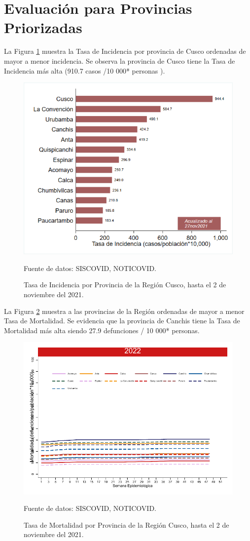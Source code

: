 \documentclass[12pt,a4paper,openany]{book}
\begin{document}

\clearpage

	\section*{Evaluación para Provincias Priorizadas}
\noindent La Figura \ref{fig:incidencia_provincias} muestra la Tasa de Incidencia por provincia de Cusco ordenadas de mayor a menor incidencia. Se observa la provincia de Cusco tiene la Tasa de Incidencia más alta (910.7 casos /10 000* personas ). 

\begin{figure}[h]
	\caption{Tasa de Incidencia por Provincia de la Región Cusco, hasta el 2 de noviembre del 2021. }\label{fig:incidencia_provincias}
	\begin{center}
		\includegraphics[width=0.5\linewidth]{../figuras/incidencia_provincial}
	\end{center}
	{\footnotesize {Fuente de datos: SISCOVID, NOTICOVID.}}
\end{figure}


La Figura \ref{fig:mortalidad_ordenada} muestra a las provincias de la Región ordenadas de mayor a menor Tasa de Mortalidad. Se evidencia que la provincia de Canchis tiene la Tasa de Mortalidad más alta siendo 27.9 defunciones / 10 000* personas.  

\begin{figure}[h]
	\caption{Tasa de Mortalidad por Provincia de la Región Cusco, hasta el 2 de noviembre del 2021. }\label{fig:mortalidad_ordenada}
	\begin{center}
		\includegraphics[width=0.5\linewidth]{../figuras/mortalidad_provincial}
	\end{center}
	{\footnotesize {Fuente de datos: SISCOVID, NOTICOVID.}}
\end{figure}
\end{document}
